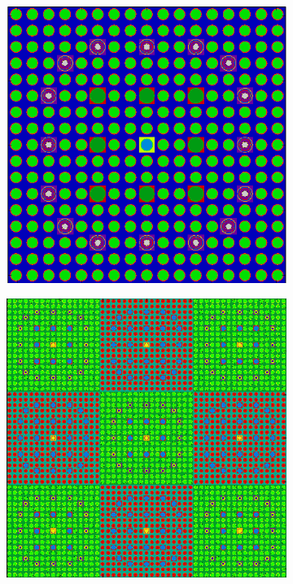\begin{figure}[h!]
\begin{subfigure}{.5\textwidth}
  \centering
  \includegraphics[width=.7\linewidth]{figures/workflow/opencg/cells-xy-24-16-assm}
  \caption{}
  \label{fig:assm-cells}
\end{subfigure}%
\begin{subfigure}{.5\textwidth}
  \centering
  \includegraphics[width=.7\linewidth]{figures/workflow/opencg/cells-xy-colorset}
  \caption{}
  \label{fig:colorset-cells}
\end{subfigure}
\begin{subfigure}{.5\textwidth}
  \centering

\end{subfigure}
\end{figure}
